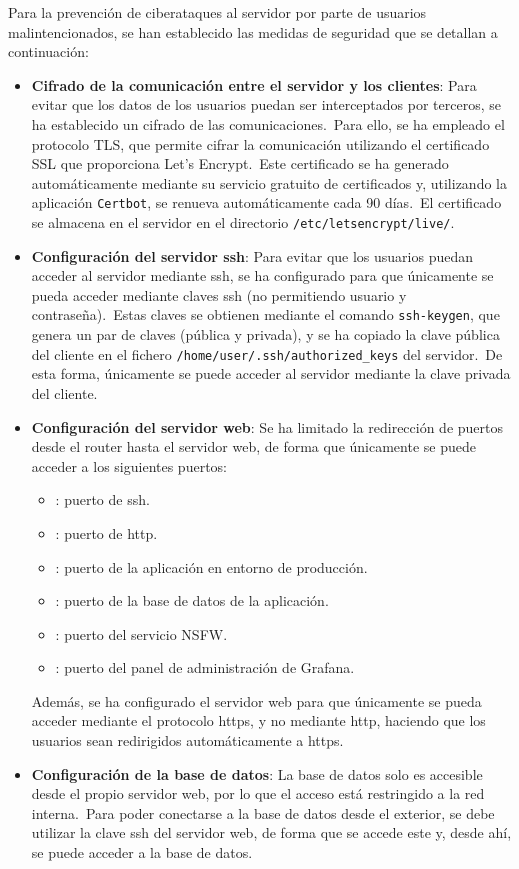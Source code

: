 
Para la prevención de ciberataques al servidor por parte de usuarios malintencionados, se han
establecido las medidas de seguridad que se detallan a continuación:

\begin{itemize}
	\item \textbf{Cifrado de la comunicación entre el servidor y los clientes}: Para evitar que los datos de los
	usuarios puedan ser interceptados por terceros, se ha establecido un cifrado de las comunicaciones.\ Para ello, se
	ha empleado el protocolo TLS, que permite cifrar la comunicación utilizando el certificado SSL que proporciona
	Let's Encrypt.\ Este certificado se ha generado automáticamente mediante su servicio gratuito de certificados y,
	utilizando la aplicación \texttt{Certbot}, se renueva automáticamente cada 90 días.\ El certificado se
	almacena en el servidor en el directorio \texttt{/etc/letsencrypt/live/}.

	\item \textbf{Configuración del servidor ssh}: Para evitar que los usuarios puedan acceder al servidor mediante
	ssh, se ha configurado para que únicamente se pueda acceder mediante claves ssh (no permitiendo usuario y
	contraseña).\ Estas claves se obtienen mediante el comando \texttt{ssh-keygen}, que genera un par de claves
	(pública y privada), y se ha copiado la clave pública del cliente en el fichero
	\texttt{/home/user/.ssh/authorized\_keys} del servidor.\ De esta forma, únicamente se puede acceder al servidor
	mediante la
	clave privada del cliente.

	\item \textbf{Configuración del servidor web}: Se ha limitado la redirección de puertos desde el router hasta el
	servidor web, de forma que únicamente se puede acceder a los siguientes puertos:

	\begin{itemize}
		\item {}: puerto de ssh.
		\item {}: puerto de http.
		\item {}: puerto de la aplicación en entorno de producción.
		\item {}: puerto de la base de datos de la aplicación.
		\item {}: puerto del servicio NSFW\@.
		\item {}: puerto del panel de administración de Grafana.
	\end{itemize}

	Además, se ha configurado el servidor web para que únicamente se pueda acceder mediante el protocolo
	https, y no mediante http, haciendo que los usuarios sean redirigidos automáticamente a https.

	\item \textbf{Configuración de la base de datos}: La base de datos solo es accesible desde el propio servidor web,
	por lo que el acceso está restringido a la red interna.\ Para poder conectarse a la base de datos desde el
	exterior, se debe utilizar la clave ssh del servidor web, de forma que se accede este y, desde ahí, se
	puede acceder a la base de datos.
\end{itemize}

